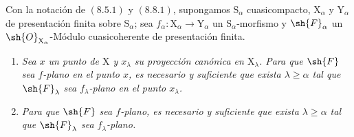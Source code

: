 \begin{theorem}[11.2.6]
\label{IV.11.2.6}
Con la notación de $(8.5.1)$ y $(8.8.1)$, supongamos $\mathrm{S}_\alpha$ cuasicompacto, $\mathrm{X}_\alpha$ y $\mathrm{Y}_\alpha$ de presentación finita sobre $\mathrm{S}_\alpha$; sea $f_\alpha:\mathrm{X}_\alpha\to\mathrm{Y}_\alpha$ un $\mathrm{S}_\alpha$-morfismo y $\sh{F}_\alpha$ un $\sh{O}_{\mathrm{X}_\alpha}$-Módulo cuasicoherente de presentación finita.


\begin{enumerate}[label=\emph{(\roman*)}]
  \item \emph{Sea $x$ un punto de $\mathrm{X}$ y $x_\lambda$ su proyección canónica en $\mathrm{X}_\lambda$. Para que $\sh{F}$ sea $f$-plano en el punto $x$, es necesario y suficiente que exista $\lambda\geqslant\alpha$ tal que $\sh{F}_\lambda$ sea $f_\lambda$-plano en el punto $x_\lambda$.}
  \item \emph{Para que $\sh{F}$ sea $f$-plano, es necesario y suficiente que exista $\lambda\geqslant\alpha$ tal que $\sh{F}_\lambda$ sea $f_\lambda$-plano.}
\end{enumerate}
\end{theorem}

